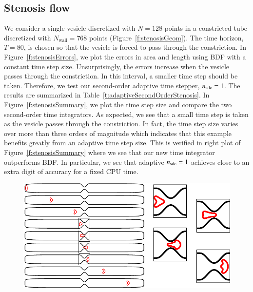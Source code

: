 \subsection{Stenosis flow}
We consider a single vesicle discretized with $N=128$ points in a
constricted tube discretized with $N_{\mathrm{wall}} = 768$ points
(Figure~\ref{f:stenosisGeom}).  The time horizon, $T=80$, is chosen so
that the vesicle is forced to pass through the constriction.  In
Figure~\ref{f:stenosisErrors}, we plot the errors in area and length
using BDF with a constant time step size.  Unsurprisingly, the errors
increase when the vesicle passes through the constriction.  In this
interval, a smaller time step should be taken.  Therefore, we test our
second-order adaptive time stepper, $n_{{\mathrm{sdc}}}=1$.  The results are
summarized in Table~\ref{t:adaptiveSecondOrderStenosis}.  In
Figure~\ref{f:stenosisSummary}, we plot the time step size and compare
the two second-order time integrators.  As expected, we see that a
small time step is taken as the vesicle passes through the
constriction.  In fact, the time step size varies over more than three
orders of magnitude which indicates that this example benefits greatly
from an adaptive time step size.  This is verified in right plot of
Figure~\ref{f:stenosisSummary} where we see that our new time
integrator outperforms BDF.  In particular, we see that adaptive
$n_{{\mathrm{sdc}}}=1$ achieves close to an extra digit of accuracy for a fixed
CPU time.

\begin{figure}[htp]
\centering
%
\includegraphics{figs/stenosisSnaps.pdf}
\end{figure}

